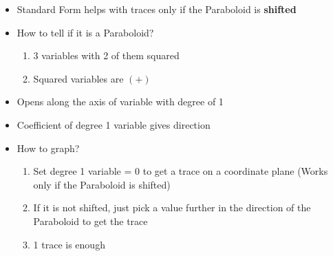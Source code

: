 \documentclass{article}
\begin{document}
\begin{itemize}
  \item Standard Form helps with traces only if the Paraboloid is \textbf{shifted}
  \item How to tell if it is a Paraboloid?
  \begin{enumerate}
    \item 3 variables with 2 of them squared
    \item Squared variables are $(+)$
  \end{enumerate}
  \item Opens along the axis of variable with degree of 1
  \item Coefficient of degree 1 variable gives direction
  \item How to graph?
  \begin{enumerate}
    \item Set degree 1 variable = 0 to get a trace on a coordinate plane (Works only if the Paraboloid is shifted)
    \item If it is not shifted, just pick a value further in the direction of the Paraboloid to get the trace
    \item 1 trace is enough
  \end{enumerate}
\end{itemize}
\end{document}
